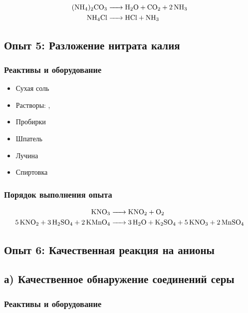 \documentclass[a4paper, 12pt]{article}
\begin{document}
\begin{align}
	\ce{(NH4)2CO3 &-> H2O + CO2 + 2 NH3}\\
	\ce{NH4Cl &-> HCl + NH3}
\end{align}


\subsection{Опыт 5: Разложение нитрата калия}

\subsubsection{Реактивы и оборудование}

\begin{itemize}
	\item Сухая соль 
	
	\item Растворы: , 
	
	\item Пробирки
	
	\item Шпатель
	
	\item Лучина
	
	\item Спиртовка
\end{itemize}

\subsubsection{Порядок выполнения опыта}

\begin{align}
	\ce{KNO3 &-> KNO2 + O2}\\
	\ce{5 KNO2 + 3 H2SO4 + 2 KMnO4 &-> 3 H2O + K2SO4 + 5 KNO3 + 2 MnSO4}
\end{align}

\subsection{Опыт 6: Качественная реакция на анионы}

\subsection*{а) Качественное обнаружение соединений серы}
\subsubsection{Реактивы и оборудование}
\end{document}

